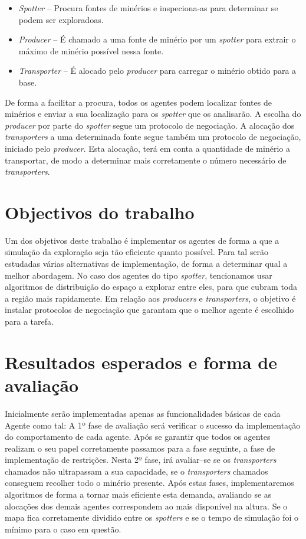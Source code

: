 \documentclass[12pt]{report}
\begin{document}
\begin{itemize}
  \item \emph{Spotter} – Procura fontes de minérios e inspeciona-as para determinar se podem ser exploradoas. 
  \item \emph{Producer} – É chamado a uma fonte de minério por um \emph{spotter} para extrair o máximo de minério possível nessa fonte. 
  \item \emph{Transporter} – É alocado pelo \emph{producer} para carregar o minério obtido para a base.
\end{itemize}

De forma a facilitar a procura, todos os agentes podem localizar fontes de minérios e enviar a sua localização para os \emph{spotter} que os analisarão. A escolha do \emph{producer} por parte do \emph{spotter} segue um protocolo de negociação. A alocação dos \emph{transporters} a uma determinada fonte segue também um protocolo de negociação, iniciado pelo \emph{producer}. Esta alocação, terá em conta a quantidade de minério a transportar, de modo a determinar mais corretamente o número necessário de \emph{transporters}.

\section{Objectivos do trabalho}

Um dos objetivos deste trabalho é implementar os agentes de forma a que a simulação da exploração seja tão eficiente quanto possível. Para tal serão estudadas várias alternativas de implementação, de forma a determinar qual a melhor abordagem. No caso dos agentes do tipo \emph{spotter}, tencionamos usar algoritmos de distribuição do espaço a explorar entre eles, para que cubram toda a região mais rapidamente. Em relação aos \emph{producers} e \emph{transporters}, o objetivo é instalar protocolos de negociação que garantam que o melhor agente é escolhido para a tarefa.

\section{Resultados esperados e forma de avaliação}

Inicialmente serão implementadas apenas as funcionalidades básicas de cada Agente como tal:
A 1º fase de avaliação será verificar o sucesso da implementação do comportamento de cada agente. Após se garantir que todos os agentes realizam o seu papel corretamente passamos para a fase seguinte, a fase de implementação de restrições. 
Nesta 2º fase, irá avaliar–se se os \emph{transporters} chamados não ultrapassam a sua capacidade, se o \emph{transporters} chamados conseguem recolher todo o minério presente. 
Após estas fases, implementaremos algoritmos de forma a tornar mais eficiente esta demanda, avaliando se as alocações dos demais agentes correspondem ao mais disponível na altura. Se o mapa fica corretamente dividido entre os \emph{spotters} e se o tempo de simulação foi o mínimo para o caso em questão.
\end{document}

